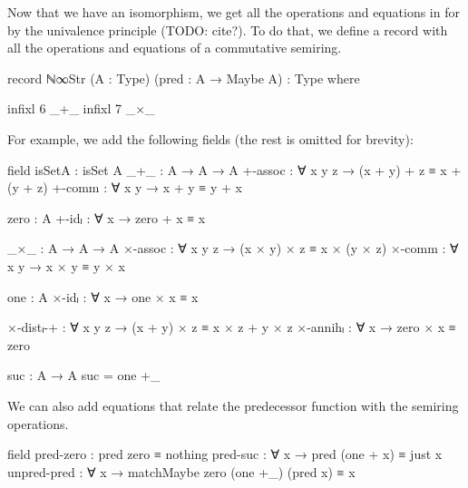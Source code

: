 Now that we have an isomorphism, we get all the operations and equations in
 for  by the univalence principle (TODO:
cite?). To do that, we define a record with all the operations and equations of
a commutative semiring.
\begin{AgdaAlign}
\begin{code}
record ℕ∞Str (A : Type) (pred : A → Maybe A) : Type where
\end{code}
\begin{code}[hide]
  infixl 6 _+_
  infixl 7 _×_
\end{code}
For example, we add the following fields (the rest is omitted for brevity):
\begin{code}
  field
    isSetA   : isSet A
    _+_      : A → A → A
    +-assoc  : ∀ x y z → (x + y) + z ≡ x + (y + z)
    +-comm   : ∀ x y → x + y ≡ y + x
\end{code}
\begin{code}[hide]
    zero : A
    +-idₗ : ∀ x → zero + x ≡ x

    _×_ : A → A → A
    ×-assoc : ∀ x y z → (x × y) × z ≡ x × (y × z)
    ×-comm : ∀ x y → x × y ≡ y × x

    one : A
    ×-idₗ : ∀ x → one × x ≡ x

    ×-distₗ-+ : ∀ x y z → (x + y) × z ≡ x × z + y × z
    ×-annihₗ : ∀ x → zero × x ≡ zero

  suc : A → A
  suc = one +_
\end{code}
We can also add equations that relate the predecessor function with the semiring
operations.
\begin{code}
  field
    pred-zero    : pred zero ≡ nothing
    pred-suc     : ∀ x → pred (one + x) ≡ just x
    unpred-pred  :
      ∀ x → matchMaybe zero (one +_) (pred x) ≡ x
\end{code}
\end{AgdaAlign}

